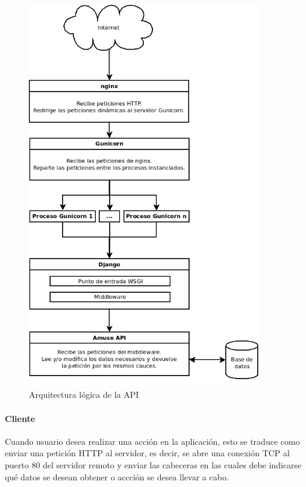 \begin{figure}[htbp]
  \centering
  \includegraphics[width=0.9\textwidth]{cap5/img/diagrama_arquitectura_logica_api}
  \caption{Arquitectura lógica de la API}
  \label{fig:arquitectura-logica-api}
\end{figure}



\paragraph{Cliente}

Cuando usuario desea realizar una acción en la aplicación, esto se traduce como
enviar una petición \ac{HTTP} al servidor, es decir, se abre una conexión
\ac{TCP} al puerto 80 del servidor remoto y enviar las cabeceras en las cuales
debe indicarse qué datos se desean obtener o accción se desea llevar a cabo.


